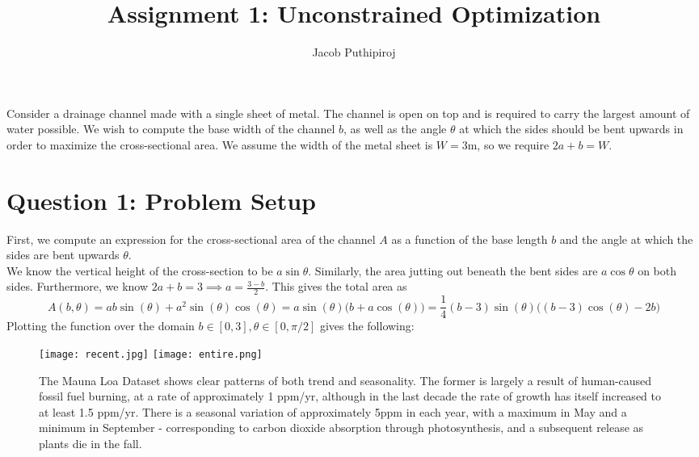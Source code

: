 \documentclass{article}
\begin{document}
\title{Assignment 1: Unconstrained Optimization}
\author{Jacob Puthipiroj}
\maketitle

Consider a drainage channel made with a single sheet of metal. The channel is open on top and is required to carry the largest amount of water possible. We wish to compute the base width of the channel $b$, as well as the angle $\theta$ at which the sides should be bent upwards in order to maximize the cross-sectional area.  We assume the width of the metal sheet is $W = 3$m, so we require $2a+b=W$.

\section*{Question 1: Problem Setup}
First, we compute an expression for the cross-sectional area of the channel $A$ as a function of the base length $b$ and the angle at which the sides are bent upwards $\theta$. \\

We know the vertical height of the cross-section to be $a \sin \theta$. Similarly, the area jutting out beneath the bent sides are $a \cos\theta$ on both sides. Furthermore, we know $2a+b=3 \implies a = \frac{3 - b}{2}$. 
This gives the total area as 
$$ A(b,\theta) = ab \sin(\theta) + a^2 \sin(\theta)  \cos(\theta)  = a \sin(\theta) \big(b+a\cos (\theta) \big) = \frac{1}{4}(b-3) \sin(\theta) \big((b-3)\cos(\theta) - 2b \big)$$
Plotting the function over the domain $b \in [0, 3], \theta \in [0, \pi/2]$ gives the following:

\begin{figure*}[h]
\texttt{[image: recent.jpg]}
\texttt{[image: entire.png]}
\caption{The Mauna Loa Dataset shows clear patterns of both trend and seasonality. The former is largely a result of human-caused fossil fuel burning, at a rate of approximately 1 ppm/yr, although in the last decade the rate of growth has itself increased to at least 1.5 ppm/yr. There is a seasonal variation of approximately 5ppm in each year, with a maximum in May and a minimum in September - corresponding to carbon dioxide absorption through photosynthesis, and a subsequent release as plants die in the fall. }
\end{figure*}
\end{document}
